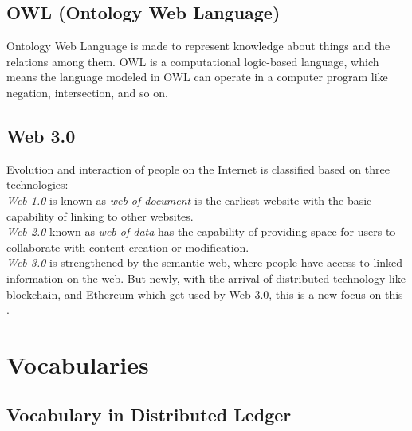 \subsection{OWL (Ontology Web Language) }
Ontology Web Language is made to represent knowledge about things and the relations among them. OWL is a computational logic-based language, which means the language modeled in OWL can operate in a computer program like negation, intersection, and so on\cite{Hector}.
\subsection{Web 3.0}
Evolution and interaction of people on the Internet is classified based on three technologies:\\
\textit{Web 1.0} is known as \textit{web of document} is the earliest website with the basic capability of linking to other websites.\\
\textit{Web 2.0} known as \textit{web of data} has the capability of providing space for users to collaborate with content creation or modification.\\
\textit{Web 3.0} is strengthened by the semantic web, where people have access to linked information on the web. But newly, with the arrival of distributed technology like blockchain, and Ethereum which get used by Web 3.0, this is a new focus on this \cite{Chhetri}.
\section{Vocabularies}
\subsection{Vocabulary in Distributed Ledger}

